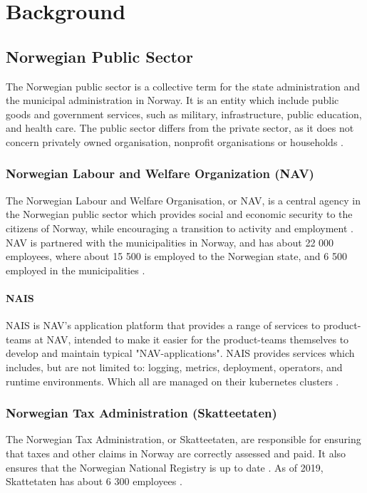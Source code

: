 \chapter{Background}
\section{Norwegian Public Sector}
The Norwegian public sector is a collective term for the state administration and the municipal administration in Norway. It is an entity which include public goods and government services, such as military, infrastructure, public education, and health care. The public sector differs from the private sector, as it does not concern privately owned organisation, nonprofit organisations or households \cite{os_snl_2022}\cite{ps_wiki_2023}.

\subsection{Norwegian Labour and Welfare Organization (NAV)}
The Norwegian Labour and Welfare Organisation, or NAV, is a central agency in the Norwegian public sector which provides social and economic security to the citizens of Norway, while encouraging a transition to activity and employment \cite{nav_r_2023}. NAV is partnered with the municipalities in Norway, and has about 22 000 employees, where about 15 500 is employed to the Norwegian state, and 6 500 employed in the municipalities \cite{org_nav_2023}. 

\subsubsection{NAIS}
NAIS is NAV's application platform that provides a range of services to product-teams at NAV, intended to make it easier for the product-teams themselves to develop and maintain typical "NAV-applications". NAIS provides services which includes, but are not limited to: logging, metrics, deployment, operators, and runtime environments. Which all are managed on their \gls{kubernetes} clusters \cite{nais_2023}.

\subsection{Norwegian Tax Administration (Skatteetaten)}
The Norwegian Tax Administration, or Skatteetaten, are responsible for ensuring that taxes and other claims in Norway are correctly assessed and paid. It also ensures that the Norwegian National Registry is up to date \cite{skatt_r_2023}. As of 2019, Skattetaten has about 6 300 employees \cite{skatt_r_2023}. 

